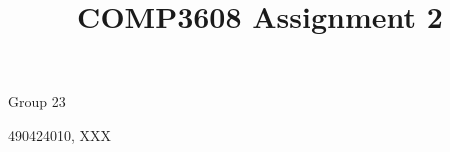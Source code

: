 \documentclass[a4paper, 12pt]{article}
\begin{document}
\title{COMP3608 Assignment 2}
\maketitle

\begin{center}Group 23\end{center}
\begin{center}490424010, XXX\end{center}

\tableofcontents






\end{document}
